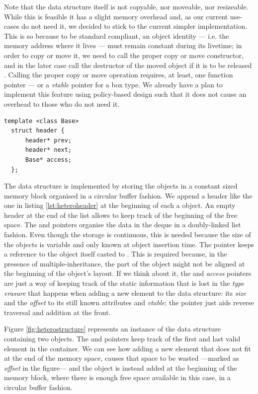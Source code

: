 Note that the data structure itself is not copyable, nor moveable, nor
resizeable. While this is feasible it has a slight memory overhead
and, as our current use-cases do not need it, we decided to stick to
the current simpler implementation. This is so because to be standard
compliant, an object identity --- i.e. the memory address where it
lives --- must remain constant during its livetime; in order to copy
or move it, we need to call the proper copy or move constructor, and
in the later case call the destructor of the moved object if it is to
be released \cite{cppstd}. Calling the proper copy or move operation
requires, at least, one function pointer --- or a \emph{vtable}
pointer for a box type. We already have a plan to implement this
feature using policy-based design \cite{alexandrescu01modern} such
that it does not cause an overhead to those who do not need it.

\begin{lstlisting}[float=b,caption=Header of heterogeneous deque elements,label=lst:heteroheader]
  template <class Base>
  struct header {
      header* prev;
      header* next;
      Base* access;
  };
\end{lstlisting}

The data structure is implemented by storing the objects in a constant
sized memory block organised in a circular buffer fashion.  We append
a header like the one in listing \ref{lst:heteroheader} at the
beginning of each a object. An empty header at the end of the list
allows to keep track of the beginning of the free space. The
 and  pointers organise the data in the deque in
a doubly-linked list fashion. Even though the storage is continuous,
this is needed because the size of the objects is variable and only
known at object insertion time. The  pointer keeps a
reference to the object itself casted to . This is
required because, in the presence of multiple-inheritance, the
 part of the object might not be aligned at the beginning
of the object's layout. If we think about it, the  and
\emph{access} pointers are just a way of keeping track of the
static information that is lost in the \emph{type erasure}
that happens when adding a new element to the data structure: its
\emph{size} and the \emph{offset} to its still known attributes and
\emph{vtable}; the  pointer just aids reverse traversal and
addition at the front.

Figure \ref{fig:heterostructure} represents an instance of the data
structure containing two objects. The  and 
pointers keep track of the first and last valid element in the
container. We can see how adding a new element that does not fit at
the end of the memory space, causes that space to be wasted ---marked
as \emph{offset} in the figure---  and the object is instead added at
the beginning of the memory block, where there is enough free space
available in this case, in a circular buffer fashion.

